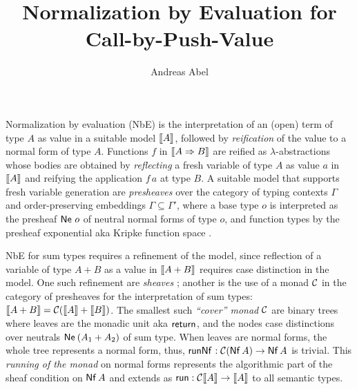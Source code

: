 \documentclass[a4paper]{easychair}
\begin{document}
\title{Normalization by Evaluation for Call-by-Push-Value}
\author{Andreas Abel}


\maketitle


\noindent

Normalization by evaluation (NbE) \citep{bergerSchwichtenberg:lics91}
is the interpretation of
an (open) term of type $A$ as value in a suitable model $\mathopen{{[\kern-0.14em[}} A \mathclose{{]\kern-0.14em]}}$,
followed by \emph{reification} of the value to a normal form of type
$A$.  Functions $f$ in $\mathopen{{[\kern-0.14em[}} A \Rightarrow B \mathclose{{]\kern-0.14em]}}$ are reified as
$\lambda$-abstractions whose bodies are obtained
by \emph{reflecting} a fresh variable of type $A$ as value $a$ in
$\mathopen{{[\kern-0.14em[}} A \mathclose{{]\kern-0.14em]}}$ and reifying the application $f\,a$ at type $B$.
A suitable model that supports fresh variable generation
are \emph{presheaves} over the category of
typing contexts $\Gamma$ and order-preserving embeddings
$\Gamma \subseteq \Gamma'$, where a base type $o$ is interpreted as
the presheaf $\mathsf{Ne}^{}\;o$ of neutral normal forms of type $o$, and
function types by the presheaf exponential aka Kripke function space
\citep{catarina:csl93,altenkirchHofmannStreicher:ctcs95}.

NbE for sum types requires a refinement of the model, since reflection of
a variable of type $A + B$ as a value in $\mathopen{{[\kern-0.14em[}} A + B \mathclose{{]\kern-0.14em]}}$ requires case
distinction in the model.  One such refinement are \emph{sheaves}
\citep{altenkirchDybjerHofmannScott:lics01}; another is the use of a
monad $\mathcal{C}$
\citep{filinski:semaccounttdpe,filinski:tlca01,barral:PhD}
in the category of presheaves
for the interpretation of sum types:
$\mathopen{{[\kern-0.14em[}} A + B \mathclose{{]\kern-0.14em]}} = \mathcal{C}(\mathopen{{[\kern-0.14em[}} A \mathclose{{]\kern-0.14em]}} + \mathopen{{[\kern-0.14em[}} B \mathclose{{]\kern-0.14em]}})$.
The smallest such \emph{``cover'' monad} $\mathcal{C}$ are binary trees where leaves are
the monadic unit aka $\mathsf{return}^{}$, and the nodes case distinctions
over neutrals $\mathsf{Ne}^{}\,(A_1 + A_2)$ of sum type.  When leaves are normal
forms, the whole tree represents a normal form, thus,
$\mathsf{runNf}^{} : \mathcal{C}(\mathsf{Nf}\,A) \to \mathsf{Nf}\,A$ is trivial.
This \emph{running of the monad}
on normal forms represents the algorithmic part of the sheaf condition
on $\mathsf{Nf}\,A$ and extends as $\mathsf{run} : \mathcal{C} \mathopen{{[\kern-0.14em[}} A \mathclose{{]\kern-0.14em]}} \to \mathopen{{[\kern-0.14em[}} A \mathclose{{]\kern-0.14em]}}$ to all
semantic types.
\end{document}
